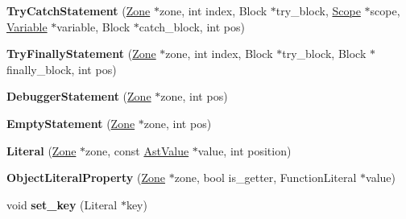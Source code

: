 \begin{DoxyCompactItemize}
\item 
\hypertarget{classv8_1_1internal_1_1_v8___f_i_n_a_l_a1907fc037a8502f1d177fda5040898bc}{}{\bfseries Try\+Catch\+Statement} (\hyperlink{classv8_1_1internal_1_1_zone}{Zone} $\ast$zone, int index, Block $\ast$try\+\_\+block, \hyperlink{classv8_1_1internal_1_1_v8___f_i_n_a_l_1_1_scope}{Scope} $\ast$scope, \hyperlink{classv8_1_1internal_1_1_variable}{Variable} $\ast$variable, Block $\ast$catch\+\_\+block, int pos)\label{classv8_1_1internal_1_1_v8___f_i_n_a_l_a1907fc037a8502f1d177fda5040898bc}

\item 
\hypertarget{classv8_1_1internal_1_1_v8___f_i_n_a_l_a454fc1ff0c491c670eae679110a69ba2}{}{\bfseries Try\+Finally\+Statement} (\hyperlink{classv8_1_1internal_1_1_zone}{Zone} $\ast$zone, int index, Block $\ast$try\+\_\+block, Block $\ast$finally\+\_\+block, int pos)\label{classv8_1_1internal_1_1_v8___f_i_n_a_l_a454fc1ff0c491c670eae679110a69ba2}

\item 
\hypertarget{classv8_1_1internal_1_1_v8___f_i_n_a_l_a7155dbe483feb7df6bfcfabd9c9d5a0a}{}{\bfseries Debugger\+Statement} (\hyperlink{classv8_1_1internal_1_1_zone}{Zone} $\ast$zone, int pos)\label{classv8_1_1internal_1_1_v8___f_i_n_a_l_a7155dbe483feb7df6bfcfabd9c9d5a0a}

\item 
\hypertarget{classv8_1_1internal_1_1_v8___f_i_n_a_l_a79a3a0175e8f4f2d1878eabd9659abb0}{}{\bfseries Empty\+Statement} (\hyperlink{classv8_1_1internal_1_1_zone}{Zone} $\ast$zone, int pos)\label{classv8_1_1internal_1_1_v8___f_i_n_a_l_a79a3a0175e8f4f2d1878eabd9659abb0}

\item 
\hypertarget{classv8_1_1internal_1_1_v8___f_i_n_a_l_a886a104dd15f6c785a15e96d20748fbd}{}{\bfseries Literal} (\hyperlink{classv8_1_1internal_1_1_zone}{Zone} $\ast$zone, const \hyperlink{classv8_1_1internal_1_1_ast_value}{Ast\+Value} $\ast$value, int position)\label{classv8_1_1internal_1_1_v8___f_i_n_a_l_a886a104dd15f6c785a15e96d20748fbd}

\item 
\hypertarget{classv8_1_1internal_1_1_v8___f_i_n_a_l_ae945152d77bf06f27047553a5c65f33c}{}{\bfseries Object\+Literal\+Property} (\hyperlink{classv8_1_1internal_1_1_zone}{Zone} $\ast$zone, bool is\+\_\+getter, Function\+Literal $\ast$value)\label{classv8_1_1internal_1_1_v8___f_i_n_a_l_ae945152d77bf06f27047553a5c65f33c}

\item 
\hypertarget{classv8_1_1internal_1_1_v8___f_i_n_a_l_a4b35995e410824c20d855e262522c643}{}void {\bfseries set\+\_\+key} (Literal $\ast$key)\label{classv8_1_1internal_1_1_v8___f_i_n_a_l_a4b35995e410824c20d855e262522c643}


\end{DoxyCompactItemize}
